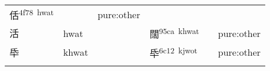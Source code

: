 \documentclass[14pt,a4paper]{scrartcl}
\begin{document}
\begin{longtable}[c]{@{}llllll@{}}
\begin{minipage}[t]{0.14\columnwidth}\raggedright\strut
佸\textsuperscript{4f78~hwat}
\strut\end{minipage} &
\begin{minipage}[t]{0.14\columnwidth}\raggedright\strut
\strut\end{minipage} &
\begin{minipage}[t]{0.14\columnwidth}\raggedright\strut
pure:other
\strut\end{minipage}\tabularnewline
\begin{minipage}[t]{0.14\columnwidth}\raggedright\strut
活
\strut\end{minipage} &
\begin{minipage}[t]{0.14\columnwidth}\raggedright\strut
hwat
\strut\end{minipage} &
\begin{minipage}[t]{0.14\columnwidth}\raggedright\strut
\strut\end{minipage} &
\begin{minipage}[t]{0.14\columnwidth}\raggedright\strut
闊\textsuperscript{95ca~khwat}
\strut\end{minipage} &
\begin{minipage}[t]{0.14\columnwidth}\raggedright\strut
\strut\end{minipage} &
\begin{minipage}[t]{0.14\columnwidth}\raggedright\strut
pure:other
\strut\end{minipage}\tabularnewline
\begin{minipage}[t]{0.14\columnwidth}\raggedright\strut
氒
\strut\end{minipage} &
\begin{minipage}[t]{0.14\columnwidth}\raggedright\strut
khwat
\strut\end{minipage} &
\begin{minipage}[t]{0.14\columnwidth}\raggedright\strut
\strut\end{minipage} &
\begin{minipage}[t]{0.14\columnwidth}\raggedright\strut
氒\textsuperscript{6c12~kjwot}
\strut\end{minipage} &
\begin{minipage}[t]{0.14\columnwidth}\raggedright\strut
\strut\end{minipage} &
\begin{minipage}[t]{0.14\columnwidth}\raggedright\strut
pure:other
\strut\end{minipage}\tabularnewline
\begin{minipage}[t]{0.14\columnwidth}\raggedright\strut

\end{minipage}
\end{longtable}
\end{document}
